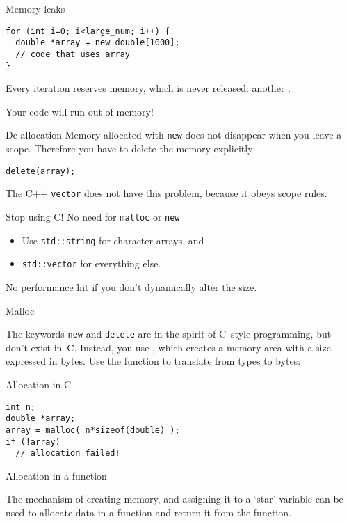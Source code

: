 \begin{block}{Memory leaks}
  \label{sl:leak2}
\begin{lstlisting}
for (int i=0; i<large_num; i++) {
  double *array = new double[1000];
  // code that uses array
}
\end{lstlisting}
  Every iteration reserves memory, which is never released:
  another .

  Your code will run out of memory!
\end{block}

\begin{block}{De-allocation}
  \label{sl:c-array-del}
  Memory allocated with \lstinline{new} does not disappear when you leave a
  scope. Therefore you have to delete the memory explicitly:
\begin{lstlisting}
delete(array);
\end{lstlisting}
The C++ \lstinline{vector} does not have this problem, because it obeys scope rules.
\end{block}

\begin{block}{Stop using C!}
  \label{sl:no-c-malloc}
  No need for \lstinline{malloc} or \lstinline{new}
  \begin{itemize}
  \item Use \lstinline{std::string} for character arrays, and
  \item \lstinline{std::vector} for everything else.
  \end{itemize}
  No performance hit if you don't dynamically alter the size.
\end{block}

 {Malloc}

The keywords \lstinline{new} and \lstinline{delete} are in the spirit of C~style
programming, but don't exist in~C. Instead, you use
, which creates a memory area with a size
expressed in bytes. Use the function  to translate
from types to bytes:

\begin{block}{Allocation in C}
\begin{lstlisting}
int n;
double *array;
array = malloc( n*sizeof(double) );
if (!array)
  // allocation failed!
\end{lstlisting}
\end{block}

 {Allocation in a function}

The mechanism of creating memory, and assigning it to a `star'
variable
can be used to allocate data in a function and
return it from the function.

